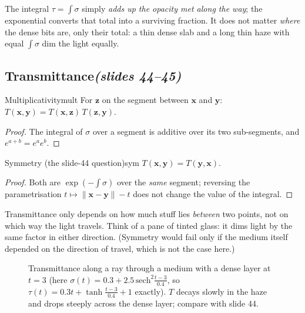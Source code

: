 \documentclass[11pt,a4paper]{article}
\newcommand{\slides}[1]{\texorpdfstring{\hfill{\normalfont\small\emph{(slides #1)}}}{ (slides #1)}}
\newcommand{\x}{\bm{x}}
\newcommand{\y}{\bm{y}}
\newcommand{\z}{\bm{z}}
\theoremstyle{remark}\newtheorem*{remark}{Remark}
\begin{document}
\begin{intuition}
The integral $\tau=\int\sigma$ simply \emph{adds up the opacity met along the way}; the exponential converts that total into a surviving fraction. It does not matter \emph{where} the dense bits are, only their total: a thin dense slab and a long thin haze with equal $\int\sigma$ dim the light equally.
\end{intuition}

\subsection{Transmittance\slides{44--45}}

\begin{lemma}{Multiplicativity}{mult}
For $\z$ on the segment between $\x$ and $\y$: $T(\x,\y)=T(\x,\z)\,T(\z,\y)$.
\end{lemma}
\begin{proof}
The integral of $\sigma$ over a segment is additive over its two sub-segments, and $e^{a+b}=e^ae^b$.
\end{proof}

\begin{lemma}{Symmetry (the slide-44 question)}{sym}
$T(\x,\y)=T(\y,\x)$.
\end{lemma}
\begin{proof}
Both are $\exp(-\int\sigma)$ over the \emph{same} segment; reversing the parametrisation $t\mapsto\|\x-\y\|-t$ does not change the value of the integral.
\end{proof}

\begin{intuition}
Transmittance only depends on how much stuff lies \emph{between} two points, not on which way the light travels. Think of a pane of tinted glass: it dims light by the same factor in either direction. (Symmetry would fail only if the medium itself depended on the direction of travel, which is not the case here.)
\end{intuition}

\begin{figure}[h]
\centering
{}
\caption{Transmittance along a ray through a medium with a dense layer at $t=3$ (here $\sigma(t)=0.3+2.5\,\mathrm{sech}^2\frac{t-3}{0.4}$, so $\tau(t)=0.3t+\tanh\frac{t-3}{0.4}+1$ exactly). $T$ decays slowly in the haze and drops steeply across the dense layer; compare with slide 44.}
\end{figure}
\end{document}
